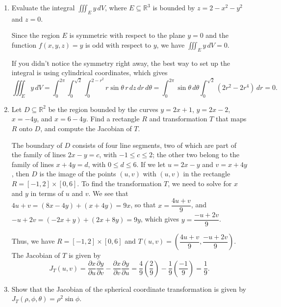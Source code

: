 \documentclass[12pt]{article}
\newcommand{\points}[1]{\marginpar{\hspace{24pt}[#1]}}
\newcommand{\di}{\displaystyle}
\begin{document}
\begin{enumerate}
\bigskip


\item Evaluate the integral $\di \iiint_E y\,dV$, where $E\subseteq\mathbb{R}^3$ is bounded by $z=2-x^2-y^2$ and $z=0$. \points{5}

\bigskip

Since the region $E$ is symmetric with respect to the plane $y=0$ and the function $f(x,y,z)=y$ is odd with respect to $y$, we have $\di \iiint_E y\,dV=0$.

\medskip

If you didn't notice the symmetry right away, the best way to set up the integral is using cylindrical coordinates, which gives
\[
 \iiint_E y\,dV = \int_0^{2\pi}\int_0^{\sqrt{2}}\int_{0}^{2-r^2}r\sin\theta\, r\,dz\,dr\,d\theta = \int_0^{2\pi}\sin\theta\, d\theta\int_0^{\sqrt{2}}(2r^2-2r^4)\, dr = 0.
\]
\newpage


\item Let $D\subseteq \mathbb{R}^2$ be the region bounded by the curves $y=2x+1$, $y=2x-2$, $x=-4y$, and $x=6-4y$. Find a rectangle $R$ and transformation $T$ that maps $R$ onto $D$, and compute the Jacobian of $T$.  \points{6}



\bigskip

The boundary of $D$ consists of four line segments, two of which are part of the family of lines $2x-y=c$, with $-1\leq c\leq 2$; the other two belong to the family of lines $x+4y=d$, with $0\leq d\leq 6$. If we let $u=2x-y$ and $v=x+4y$, then $D$ is the image of the points $(u,v)$ with $(u,v)$ in the rectangle $R = [-1,2]\times [0,6]$. To find the transformation $T$, we need to solve for $x$ and $y$ in terms of $u$ and $v$. We see that $4u+v = (8x-4y)+(x+4y) = 9x$, so that $x = \dfrac{4u+v}{9}$, and $-u+2v = (-2x+y)+(2x+8y) = 9y$, which gives $y= \dfrac{-u+2v}{9}$.

Thus, we have $R=[-1,2]\times [0,6]$ and $T(u,v) = \left(\dfrac{4u+v}{9},\dfrac{-u+2v}{9}\right)$. The Jacobian of $T$ is given by
\[
 J_T(u,v) = \frac{\partial x}{\partial u}\frac{\partial y}{\partial v}-\frac{\partial x}{\partial v}\frac{\partial y}{\partial u} = \frac{4}{9}\left(\frac{2}{9}\right)-\frac{1}{9}\left(\frac{-1}{9}\right) = \frac{1}{9}.
\]


\item Show that the Jacobian of the spherical coordinate transformation is given by $J_T(\rho,\phi,\theta) = \rho^2\sin\phi$.\points{4}


\bigskip


\end{enumerate}
\end{document}
